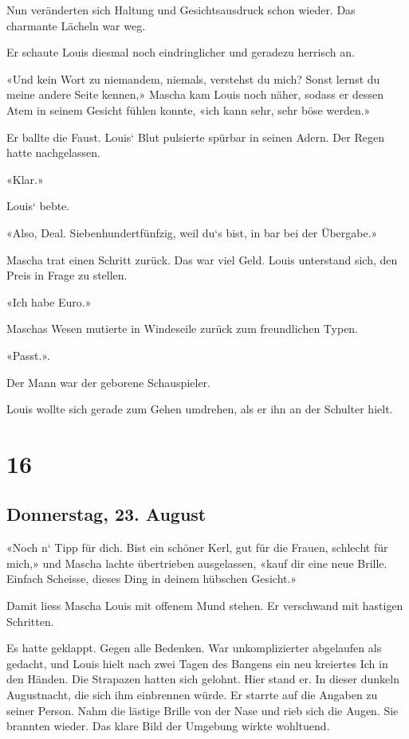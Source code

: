 Nun veränderten sich Haltung und Gesichtsausdruck schon wieder. Das
charmante Lächeln war weg.

Er schaute Louis diesmal noch eindringlicher und geradezu herrisch an.

«Und kein Wort zu niemandem, niemals, verstehst du mich? Sonst lernst du
meine andere Seite kennen,» Mascha kam Louis noch näher, sodass er
dessen Atem in seinem Gesicht fühlen konnte, «ich kann sehr, sehr böse
werden.»

Er ballte die Faust. Louis` Blut pulsierte spürbar in seinen Adern. Der
Regen hatte nachgelassen.

«Klar.»

Louis` bebte.

«Also, Deal. Siebenhundertfünfzig, weil du`s bist, in bar bei der
Übergabe.»

Mascha trat einen Schritt zurück. Das war viel Geld. Louis unterstand
sich, den Preis in Frage zu stellen.

«Ich habe Euro.»

Maschas Wesen mutierte in Windeseile zurück zum freundlichen Typen.

«Passt.».

Der Mann war der geborene Schauspieler.

Louis wollte sich gerade zum Gehen umdrehen, als er ihn an der Schulter
hielt.

\chapter{16}\label{section-15}

\section{Donnerstag, 23. August}\label{donnerstag-23.-august}

«Noch n` Tipp für dich. Bist ein schöner Kerl, gut für die Frauen,
schlecht für mich,» und Mascha lachte übertrieben ausgelassen, «kauf dir
eine neue Brille. Einfach Scheisse, dieses Ding in deinem hübschen
Gesicht.»

Damit liess Mascha Louis mit offenem Mund stehen. Er verschwand mit
hastigen Schritten.

Es hatte geklappt. Gegen alle Bedenken. War unkomplizierter abgelaufen
als gedacht, und Louis hielt nach zwei Tagen des Bangens ein neu
kreiertes Ich in den Händen. Die Strapazen hatten sich gelohnt. Hier
stand er. In dieser dunkeln Augustnacht, die sich ihm einbrennen würde.
Er starrte auf die Angaben zu seiner Person. Nahm die lästige Brille von
der Nase und rieb sich die Augen. Sie brannten wieder. Das klare Bild
der Umgebung wirkte wohltuend.

